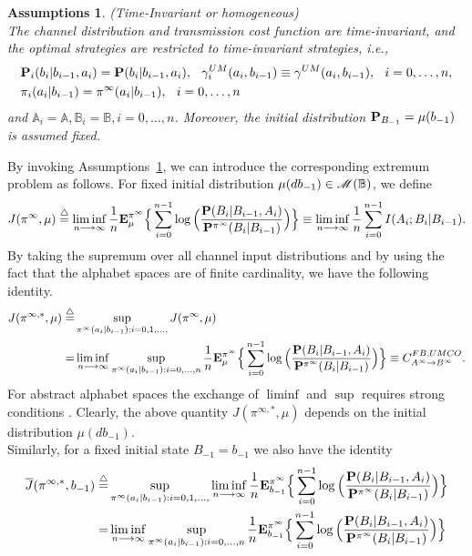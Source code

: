 \documentclass[11pt, a4paper, journal,onecolumn]{IEEEtran}
\newcommand{\mb}{\mathbb}
\newcommand{\sr}{\stackrel}
\newcommand{\rar}{\rightarrow}
\newcommand{\tri}{\sr{\triangle}{=}}
\newcommand{\hso}{\hspace{.1in}}
\newtheorem{assumptions}{Assumptions}[section]
\begin{document}
\begin{assumptions}(Time-Invariant or homogeneous)\\
\label{TI_AS}
The  channel distribution and transmission cost function are time-invariant, and the optimal strategies are restricted to time-invariant  strategies,    i.e., 
\begin{align}
&{\bf P}_i(b_i|b_{i-1},a_i)={\bf P}(b_i|b_{i-1},a_i),\hso {\gamma}_{i}^{UM}(a_i,b_{i-1})\equiv{\gamma}^{UM}(a_i,b_{i-1}), \hso i=0, \ldots, n, \\
& \pi_i(a_i|b_{i-1})=\pi^{\infty}(a_i|b_{i-1}), \hso i=0, \ldots, n
\end{align}
and ${\mb A}_i={\mb A}, {\mb B}_i={\mb B}, i=0, \ldots, n$. 
Moreover, the initial distribution ${\bf P}_{B_{-1}}=\mu(b_{-1})$ is assumed fixed.
\end{assumptions}
By invoking Assumptions~\ref{TI_AS}, we can introduce the corresponding extremum problem as follows. For fixed initial distribution $\mu(db_{-1}) \in {\cal M}({\mb B})$, we define 
\begin{equation}
J(\pi^{\infty},\mu)\tri \liminf_{n\longrightarrow \infty}  \frac{1}{n}{\bf E}_{\mu}^{\pi^{\infty}}\Big\{\sum_{i=0}^{n-1}\log\Big(\frac{{\bf P}(B_i|B_{i-1},A_i)}{{\bf P}^{\pi^{\infty}}(B_i|B_{i-1})}\Big)\Big\}\equiv \liminf_{n\longrightarrow \infty}  \frac{1}{n}\sum_{i=0}^{n-1}I(A_i;B_i|B_{i-1})   . \label{TI_BM_a}
\end{equation}
By taking the  supremum over all channel input distributions \cite{hernandezlerma-lasserre1996} and by using the fact that the alphabet spaces are of finite cardinality,  we have the following identity. 
\begin{align}
J(\pi^{\infty,*},\mu)\tri & \sup_{ \pi^\infty(a_i|b_{i-1}): i=0,1, \ldots, } J(\pi^{\infty},\mu) \\
=& \liminf_{n\longrightarrow \infty} \sup_{\pi^\infty(a_i|b_{i-1}): i=0, \ldots, n} \frac{1}{n}{\bf E}_{\mu}^{\pi^{\infty}}\Big\{\sum_{i=0}^{n-1}\log\Big(\frac{{\bf P}(B_i|B_{i-1},A_i)}{{\bf P}^{\pi^{\infty}}(B_i|B_{i-1})}\Big)\Big\}\equiv  C_{A^\infty \rar B^\infty}^{FB,UMCO}. \label{TI_BM}
\end{align}
For abstract alphabet spaces the exchange of $\liminf$ and $\sup$ requires strong conditions \cite{hernandezlerma-lasserre1996}. 
Clearly, the above quantity $J(\pi^{\infty,*},\mu)$ depends on the initial distribution $\mu(db_{-1})$.\\
Similarly, for a fixed initial state $B_{-1}=b_{-1}$ we also have the identity
\begin{align}
\overline{J}(\pi^{\infty,*},b_{-1}) \tri & \sup_{ \pi^\infty(a_i|b_{i-1}): i=0,1, \ldots, } \liminf_{n\longrightarrow \infty} \frac{1}{n}{\bf E}_{b_{-1}}^{\pi^{\infty}}\Big\{\sum_{i=0}^{n-1}\log\Big(\frac{{\bf P}(B_i|B_{i-1},A_i)}{{\bf P}^{\pi^{\infty}}(B_i|B_{i-1})}\Big)\Big\} \label{TI_BM_IS_a} \\
=& \liminf_{n\longrightarrow \infty} \sup_{\pi^\infty(a_i|b_{i-1}): i=0, \ldots, n} \frac{1}{n}{\bf E}_{b_{-1}}^{\pi^{\infty}}\Big\{\sum_{i=0}^{n-1}\log\Big(\frac{{\bf P}(B_i|B_{i-1},A_i)}{{\bf P}^{\pi^{\infty}}(B_i|B_{i-1})}\Big)\Big\} \label{TI_BM_IS}
\end{align}
\end{document}
